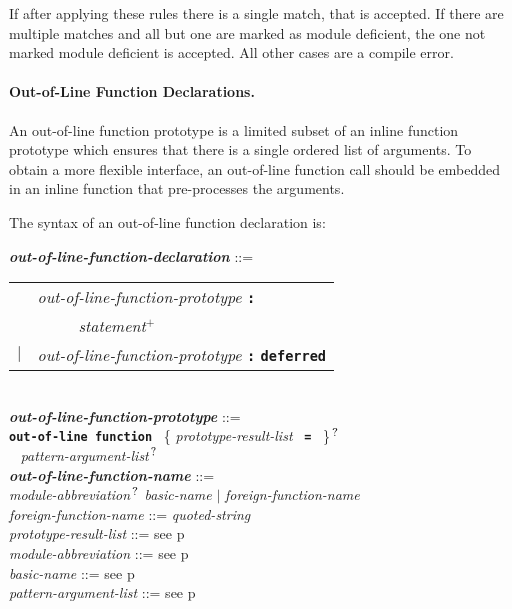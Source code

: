 \documentclass[12pt]{article}
\newcommand{\subsubsubsection}[1]{\paragraph[#1]{#1.}}
\newcommand{\TT}[1]{{\tt \bfseries #1}}
\newcommand{\PLUS}[1][]{{$^{+#1}$}}
\newcommand{\QMARK}{{$^{\,\mbox{\footnotesize ?}}$}}
\newcommand{\ttkey}[1]{{\tt \bfseries #1}}
\newcommand{\emkey}[1]{{\em \bfseries #1}}
\newcommand{\pagref}[1]{p\pageref{#1}}
\newenvironment{indpar}[1][0.3in]%
	{\begin{list}{}%
		     {\setlength{\itemsep}{0in}%
		      \setlength{\topsep}{0in}%
		      \setlength{\parsep}{1ex}%
		      \setlength{\labelwidth}{#1}%
		      \setlength{\leftmargin}{#1}%
		      \addtolength{\leftmargin}{\labelsep}}%
	 \item}%
	{\end{list}}
\begin{document}
If after applying these rules there is a single match, that
is accepted.  If there are multiple matches and all but one
are marked as module deficient, the one not marked module
deficient is accepted.  All other cases are a compile error.

\subsubsubsection{Out-of-Line Function Declarations}
\label{OUT-OF-LINE-FUNCTION-DECLARATIONS}

An out-of-line function prototype is a limited subset of
an inline function prototype which ensures that there is
a single ordered list of arguments.  To obtain a more
flexible interface, an out-of-line function call should
be embedded in an inline function that pre-processes the
arguments.

The syntax of an out-of-line function declaration is:

\begin{indpar}
\emkey{out-of-line-function-declaration}%
	\label{OUT-OF-LINE-FUNCTION-DECLARATION} ::= \\
\hspace*{0.5in}
    \begin{tabular}[t]{rl}
        &  {\em out-of-line-function-prototype} \TT{:} \\
	& \TT{~~~~~}{\em statement}\PLUS{} \\
    $|$ &  {\em out-of-line-function-prototype} \TT{:} \ttkey{deferred} \\
    \end{tabular}
\\[2ex]
\emkey{out-of-line-function-prototype}%
	\label{OUT-OF-LINE-FUNCTION-PROTOTYPE} ::= \\
\hspace*{0.25in} \ttkey{out-of-line function}~
          \{ {\em prototype-result-list}~ \TT{=}~ \}\QMARK{} \\
\hspace*{0.5in}{\em out-of-line-function-name}~
	      {\em pattern-argument-list}\QMARK{}
\\[0.5ex]
\emkey{out-of-line-function-name} ::= \\
\hspace*{0.25in}
    {\em module-abbreviation}\QMARK{} {\em basic-name}
    $|$ {\em foreign-function-name}
\\[0.5ex]
{\em foreign-function-name} ::= {\em quoted-string}
\\[0.5ex]
{\em prototype-result-list} ::= see \pagref{PROTOTYPE-RESULT-LIST}
\\[0.5ex]
{\em module-abbreviation} ::= see \pagref{MODULE-ABBREVIATION}
\\[0.5ex]
{\em basic-name} ::= see \pagref{BASIC-NAME}
\\[0.5ex]
{\em pattern-argument-list} ::= see \pagref{PATTERN-ARGUMENT-LIST}


\end{indpar}
\end{document}
